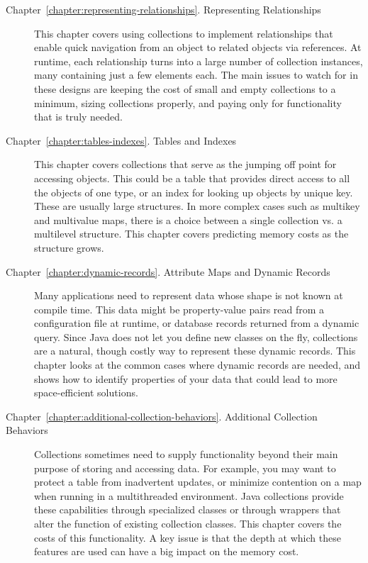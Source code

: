 \begin{description}
\item[Chapter~\ref{chapter:representing-relationships}. Representing
Relationships] This chapter covers using 
collections to implement relationships that enable quick
navigation from an object to related objects via references. At runtime,
each relationship turns into a large number of collection instances, many containing just a few elements each.
The main issues to watch for in these designs
are keeping the cost of small and empty collections to a minimum, sizing
collections properly, and paying only for functionality that is truly needed.

\item[Chapter~\ref{chapter:tables-indexes}. Tables and Indexes] This
chapter covers collections that serve as the jumping off point for accessing
objects. This could be a table that provides direct access to all the
objects of one type, or an index for looking up objects by unique key. These are
usually large structures. In more complex cases such as multikey and multivalue maps,
there is a choice between a single collection vs. a multilevel structure.
This chapter covers predicting memory costs as the structure
grows.

\item[Chapter~\ref{chapter:dynamic-records}. Attribute Maps and Dynamic
Records] Many applications need to represent data whose shape is not
known at compile time. This data might be property-value pairs
read from a configuration file at runtime, or database records returned from
a dynamic query. Since Java does not let you define new classes on the
fly, collections are a natural, though costly way to represent these
dynamic records. This chapter looks at the common cases where dynamic records
are needed, and shows how to identify properties of your data that could lead to
more space-efficient solutions.

\item[Chapter~\ref{chapter:additional-collection-behaviors}. Additional
Collection Behaviors] Collections sometimes need to supply functionality
beyond their main purpose of storing and accessing data. For example,
you may want to protect a table from inadvertent
updates, or minimize contention on a map when running in a
multithreaded environment. Java collections provide these capabilities through
specialized classes or through wrappers that alter
the function of existing collection classes. This chapter covers the costs of
this functionality. A key issue is that the depth
at which these features are used can have a big impact on the memory
cost.

\end{description}

